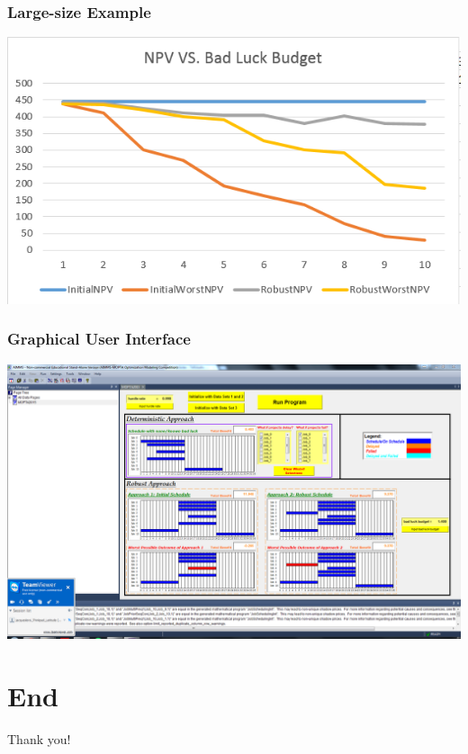 \documentclass{beamer}
\begin{document}
\begin{frame}
\frametitle{Large-size Example}
\begin{center}
\includegraphics[scale=0.45] {last.png} 
\end{center}
\end{frame}
		
		\begin{frame}
			\frametitle{Graphical User Interface}
			\begin{center}
				\includegraphics[trim=112mm 40mm 7mm 26mm,clip,scale=0.35]{../MOPTA2015Report/Data1hp990w1p400.png}
			\end{center}
		\end{frame}

	\section*{End}
		\begin{frame}
			\begin{center}
				\Huge Thank you!
			\end{center}
		\end{frame}
\end{document}
